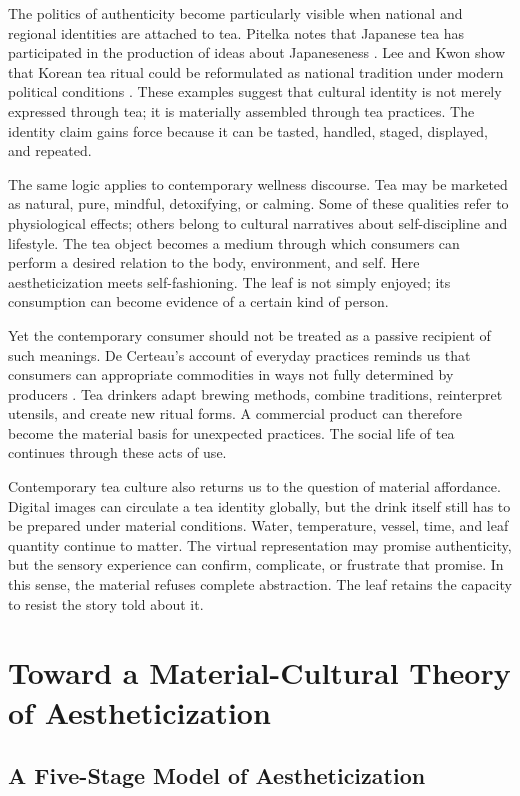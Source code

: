 \documentclass[numbers]{IntechOpen-Book}
\begin{document}
The politics of authenticity become particularly visible when national and regional identities are attached to tea. Pitelka notes that Japanese tea has participated in the production of ideas about Japaneseness \cite{pitelka}. Lee and Kwon show that Korean tea ritual could be reformulated as national tradition under modern political conditions \cite{leekwon}. These examples suggest that cultural identity is not merely expressed through tea; it is materially assembled through tea practices. The identity claim gains force because it can be tasted, handled, staged, displayed, and repeated.

The same logic applies to contemporary wellness discourse. Tea may be marketed as natural, pure, mindful, detoxifying, or calming. Some of these qualities refer to physiological effects; others belong to cultural narratives about self-discipline and lifestyle. The tea object becomes a medium through which consumers can perform a desired relation to the body, environment, and self. Here aestheticization meets self-fashioning. The leaf is not simply enjoyed; its consumption can become evidence of a certain kind of person.

Yet the contemporary consumer should not be treated as a passive recipient of such meanings. De Certeau's account of everyday practices reminds us that consumers can appropriate commodities in ways not fully determined by producers \cite{decertau}. Tea drinkers adapt brewing methods, combine traditions, reinterpret utensils, and create new ritual forms. A commercial product can therefore become the material basis for unexpected practices. The social life of tea continues through these acts of use.

Contemporary tea culture also returns us to the question of material affordance. Digital images can circulate a tea identity globally, but the drink itself still has to be prepared under material conditions. Water, temperature, vessel, time, and leaf quantity continue to matter. The virtual representation may promise authenticity, but the sensory experience can confirm, complicate, or frustrate that promise. In this sense, the material refuses complete abstraction. The leaf retains the capacity to resist the story told about it.

\section{Toward a Material-Cultural Theory of Aestheticization}

\subsection{A Five-Stage Model of Aestheticization}
\end{document}
